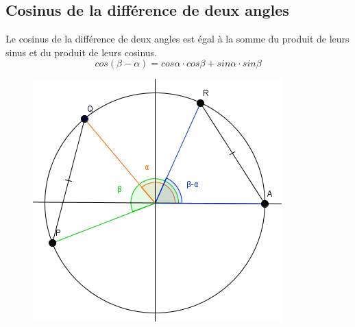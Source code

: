 \documentclass[a4paper,12pt]{article}
\begin{document}
\pagebreak
\subsection{Cosinus de la différence de deux angles}
\begin{theorem}
Le cosinus de la différence de deux angles est égal à la somme du produit de leurs sinus et du produit de leurs cosinus.
\begin{equation}
    cos(\beta-\alpha) = cos \alpha \cdot cos \beta + sin \alpha \cdot sin \beta
\end{equation}
\end{theorem}
\begin{figure}[H]
    \centering
    \includegraphics[scale=0.8]{schema/diff.PNG}
\end{figure}
\end{document}
